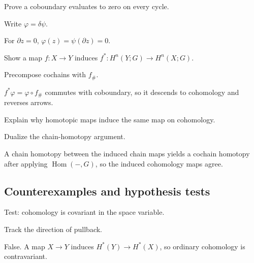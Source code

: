 \begin{exercise}\label{exr:viii28-ped-07}
Prove a coboundary evaluates to zero on every cycle.
\end{exercise}
\begin{hint}
Write $\varphi=\delta\psi$.
\end{hint}
\begin{solution}
For $\partial z=0$, $\varphi(z)=\psi(\partial z)=0$.
\end{solution}

\begin{exercise}[Contravariance]\label{exr:viii28-ped-08}
Show a map $f:X\to Y$ induces $f^*:H^n(Y;G)\to H^n(X;G)$.
\end{exercise}
\begin{hint}
Precompose cochains with $f_\#$.
\end{hint}
\begin{solution}
$f^*\varphi=\varphi\circ f_\#$ commutes with coboundary, so it descends to cohomology and reverses arrows.
\end{solution}

\begin{exercise}\label{exr:viii28-ped-09}
Explain why homotopic maps induce the same map on cohomology.
\end{exercise}
\begin{hint}
Dualize the chain-homotopy argument.
\end{hint}
\begin{solution}
A chain homotopy between the induced chain maps yields a cochain homotopy after applying $\operatorname{Hom}(-,G)$, so the induced cohomology maps agree.
\end{solution}

\subsection*{Counterexamples and hypothesis tests}

\begin{exercise}\label{exr:viii28-ped-10}
Test: cohomology is covariant in the space variable.
\end{exercise}
\begin{hint}
Track the direction of pullback.
\end{hint}
\begin{solution}
False. A map $X\to Y$ induces $H^*(Y)\to H^*(X)$, so ordinary cohomology is contravariant.
\end{solution}


